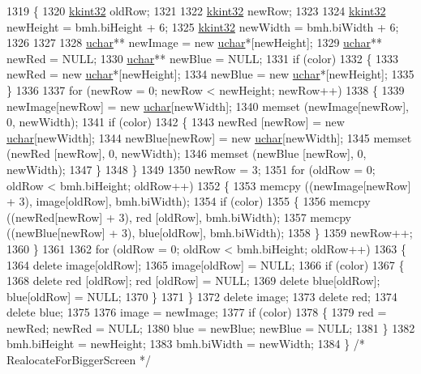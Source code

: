 \begin{DoxyCode}
1319 \{
1320   \hyperlink{namespace_k_k_b_a8fa4952cc84fda1de4bec1fbdd8d5b1b}{kkint32}  oldRow;
1321 
1322   \hyperlink{namespace_k_k_b_a8fa4952cc84fda1de4bec1fbdd8d5b1b}{kkint32}  newRow;
1323 
1324   \hyperlink{namespace_k_k_b_a8fa4952cc84fda1de4bec1fbdd8d5b1b}{kkint32}  newHeight = bmh.biHeight + 6;
1325   \hyperlink{namespace_k_k_b_a8fa4952cc84fda1de4bec1fbdd8d5b1b}{kkint32}  newWidth  = bmh.biWidth  + 6;
1326 
1327 
1328   \hyperlink{namespace_k_k_b_ace9969169bf514f9ee6185186949cdf7}{uchar}**  newImage = \textcolor{keyword}{new} \hyperlink{namespace_k_k_b_ace9969169bf514f9ee6185186949cdf7}{uchar}*[newHeight];
1329   \hyperlink{namespace_k_k_b_ace9969169bf514f9ee6185186949cdf7}{uchar}**  newRed = NULL;
1330   \hyperlink{namespace_k_k_b_ace9969169bf514f9ee6185186949cdf7}{uchar}**  newBlue = NULL;
1331   \textcolor{keywordflow}{if}  (color)
1332   \{
1333      newRed  = \textcolor{keyword}{new} \hyperlink{namespace_k_k_b_ace9969169bf514f9ee6185186949cdf7}{uchar}*[newHeight];
1334      newBlue = \textcolor{keyword}{new} \hyperlink{namespace_k_k_b_ace9969169bf514f9ee6185186949cdf7}{uchar}*[newHeight];
1335   \}
1336 
1337   \textcolor{keywordflow}{for}  (newRow = 0; newRow < newHeight; newRow++)
1338   \{
1339     newImage[newRow] = \textcolor{keyword}{new} \hyperlink{namespace_k_k_b_ace9969169bf514f9ee6185186949cdf7}{uchar}[newWidth];
1340     memset (newImage[newRow], 0, newWidth);
1341     \textcolor{keywordflow}{if}  (color)
1342     \{
1343       newRed [newRow] = \textcolor{keyword}{new} \hyperlink{namespace_k_k_b_ace9969169bf514f9ee6185186949cdf7}{uchar}[newWidth];
1344       newBlue[newRow] = \textcolor{keyword}{new} \hyperlink{namespace_k_k_b_ace9969169bf514f9ee6185186949cdf7}{uchar}[newWidth];
1345       memset (newRed  [newRow], 0, newWidth);
1346       memset (newBlue [newRow], 0, newWidth);
1347     \}
1348   \}
1349 
1350   newRow = 3;
1351   \textcolor{keywordflow}{for}  (oldRow = 0; oldRow < bmh.biHeight; oldRow++)
1352   \{
1353     memcpy ((newImage[newRow] + 3), image[oldRow], bmh.biWidth);
1354     \textcolor{keywordflow}{if}  (color)
1355     \{
1356       memcpy ((newRed[newRow]  + 3), red [oldRow], bmh.biWidth);
1357       memcpy ((newBlue[newRow] + 3), blue[oldRow], bmh.biWidth);
1358     \}
1359     newRow++;
1360   \}
1361 
1362   \textcolor{keywordflow}{for}  (oldRow = 0; oldRow < bmh.biHeight; oldRow++)
1363   \{
1364     \textcolor{keyword}{delete}  image[oldRow];
1365     image[oldRow] = NULL;
1366     \textcolor{keywordflow}{if}  (color)
1367     \{
1368       \textcolor{keyword}{delete}  red [oldRow];  red [oldRow] = NULL;
1369       \textcolor{keyword}{delete}  blue[oldRow];  blue[oldRow] = NULL;
1370     \}
1371   \}
1372   \textcolor{keyword}{delete} image;
1373   \textcolor{keyword}{delete} red;
1374   \textcolor{keyword}{delete} blue;
1375 
1376   image = newImage;
1377   \textcolor{keywordflow}{if}  (color)
1378   \{
1379     red  = newRed;    newRed  = NULL;
1380     blue = newBlue;   newBlue = NULL;
1381   \}
1382   bmh.biHeight = newHeight;
1383   bmh.biWidth  = newWidth;
1384 \}  \textcolor{comment}{/* RealocateForBiggerScreen */}
\end{DoxyCode}
